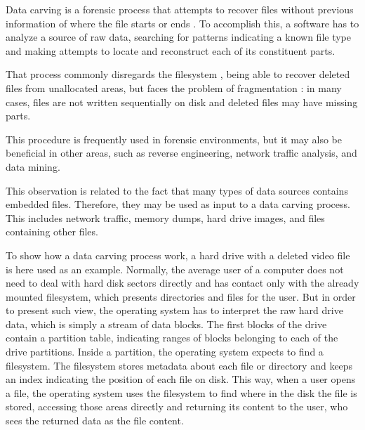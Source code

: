 


Data carving is a forensic process that attempts to recover files without previous information of where the file starts or ends \cite{garfinkel_carving_2007}.
To accomplish this, a software has to analyze a source of raw data, searching for patterns indicating a known file type and making attempts to locate and reconstruct each of its constituent parts.

That process commonly disregards the filesystem \cite{veenman_statistical_2007}, being able to recover deleted files from unallocated areas, but faces the problem of fragmentation \cite{veenman_statistical_2007}  \cite{pal_evolution_2009}: in many cases, files are not written sequentially on disk and deleted files may have missing parts.

This procedure is frequently used in forensic environments, but it may also be beneficial in other areas, such as reverse engineering, network traffic analysis, and data mining.

This observation is related to the fact that many types of data sources contains embedded files. Therefore, they may be used as input to a data carving process. This includes network traffic, memory dumps, hard drive images, and files containing other files.

To show how a data carving process work, a hard drive with a deleted video file is here used as an example.
Normally, the average user of a computer does not need to deal with hard disk sectors directly and has contact only with the already mounted filesystem, which presents directories and files for the user. But in order to present such view, the operating system has to interpret the raw hard drive data, which is simply a stream of data blocks. The first blocks of the drive contain a partition table, indicating ranges of blocks belonging to each of the drive partitions. Inside a partition, the operating system expects to find a filesystem. The filesystem stores metadata about each file or directory and keeps an index indicating the position of each file on disk. This way, when a user opens a file, the operating system uses the filesystem to find where in the disk the file is stored, accessing those areas directly and returning its content to the user, who sees the returned data as the file content. 
 
